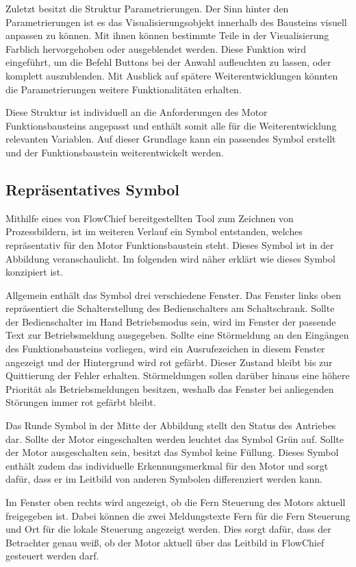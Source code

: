 Zuletzt besitzt die Struktur Parametrierungen. Der Sinn hinter den Parametrierungen ist es das Visualisierungsobjekt innerhalb des Bausteins visuell anpassen zu können. Mit ihnen können bestimmte Teile in der Visualisierung Farblich hervorgehoben oder ausgeblendet werden. Diese Funktion wird eingeführt, um die Befehl Buttons bei der Anwahl aufleuchten zu lassen, oder komplett auszublenden. Mit Ausblick auf spätere Weiterentwicklungen könnten die Parametrierungen weitere Funktionalitäten erhalten.

Diese Struktur ist individuell an die Anforderungen des Motor Funktionsbausteins angepasst und enthält somit alle für die Weiterentwicklung relevanten Variablen. Auf dieser Grundlage kann ein passendes Symbol erstellt und der Funktionsbaustein weiterentwickelt werden.

\subsection{Repräsentatives Symbol}

Mithilfe eines von FlowChief bereitgestellten Tool zum Zeichnen von Prozessbildern, ist im weiteren Verlauf ein Symbol entstanden, welches repräsentativ für den Motor Funktionsbaustein steht. Dieses Symbol ist in der Abbildung veranschaulicht. Im folgenden wird näher erklärt wie dieses Symbol konzipiert ist.

Allgemein enthält das Symbol drei verschiedene Fenster. Das Fenster links oben repräsentiert die Schalterstellung des Bedienschalters am Schaltschrank. Sollte der Bedienschalter im Hand Betriebsmodus sein, wird im Fenster der passende Text zur Betriebsmeldung ausgegeben. Sollte eine Störmeldung an den Eingängen des Funktionsbausteins vorliegen, wird ein Ausrufezeichen in diesem Fenster angezeigt und der Hintergrund wird rot gefärbt. Dieser Zustand bleibt bis zur Quittierung der Fehler erhalten. Störmeldungen sollen darüber hinaus eine höhere Priorität als Betriebsmeldungen besitzen, weshalb das Fenster bei anliegenden Störungen immer rot gefärbt bleibt.

Das Runde Symbol in der Mitte der Abbildung stellt den Status des Antriebes dar. Sollte der Motor eingeschalten werden leuchtet das Symbol Grün auf. Sollte der Motor ausgeschalten sein, besitzt das Symbol keine Füllung. Dieses Symbol enthält zudem das individuelle Erkennungsmerkmal für den Motor und sorgt dafür, dass er im Leitbild von anderen Symbolen differenziert werden kann.

Im Fenster oben rechts wird angezeigt, ob die Fern Steuerung des Motors aktuell freigegeben ist. Dabei können die zwei Meldungstexte Fern für die Fern Steuerung und Ort für die lokale Steuerung angezeigt werden. Dies sorgt dafür, dass der Betrachter genau weiß, ob der Motor aktuell über das Leitbild in FlowChief gesteuert werden darf.

